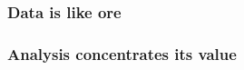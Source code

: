 \documentclass[12pt,handout]{beamer}
\begin{document}
{
\begin{frame}[plain]
\frametitle{Data is like ore}
\end{frame}
}

{
\begin{frame}[plain]
\frametitle{Analysis concentrates its value}
\end{frame}
}
\end{document}
